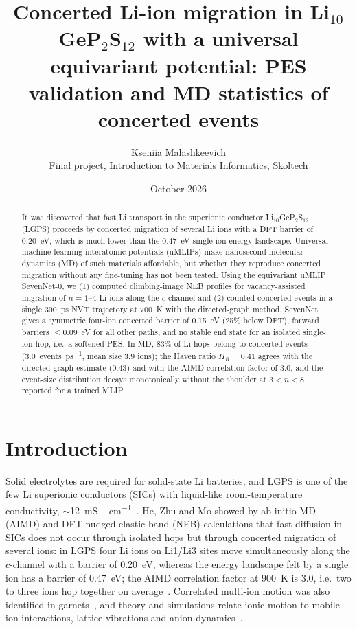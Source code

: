 \documentclass[11pt,a4paper]{article}
\title{\vspace{-1.2cm}\textbf{Concerted Li-ion migration in Li$_{10}$GeP$_2$S$_{12}$ with a universal equivariant potential: PES validation and MD statistics of concerted events}}
\author{Kseniia Malashkeevich \\ \small Final project, Introduction to Materials Informatics, Skoltech}
\date{\small October 2026}
\begin{document}
\maketitle
\vspace{-0.6cm}

\begin{abstract}
\noindent It was discovered that fast Li transport in the superionic conductor Li$_{10}$GeP$_2$S$_{12}$ (LGPS) proceeds by concerted migration of several Li ions with a DFT barrier of \SI{0.20}{eV}, which is much lower than the \SI{0.47}{eV} single-ion energy landscape. Universal machine-learning interatomic potentials (uMLIPs) make nanosecond molecular dynamics (MD) of such materials affordable, but whether they reproduce concerted migration without any fine-tuning has not been tested. Using the equivariant uMLIP SevenNet-0, we (1) computed climbing-image NEB profiles for vacancy-assisted migration of $n=1$--4 Li ions along the $c$-channel and (2) counted concerted events in a single \SI{300}{ps} NVT trajectory at \SI{700}{K} with the directed-graph method. SevenNet gives a symmetric four-ion concerted barrier of \SI{0.15}{eV} (25\% below DFT), forward barriers $\le$\SI{0.09}{eV} for all other paths, and no stable end state for an isolated single-ion hop, i.e.\ a softened PES. In MD, 83\% of Li hops belong to concerted events (\SI{3.0}{events\per ps}, mean size 3.9 ions); the Haven ratio $H_R=0.41$ agrees with the directed-graph estimate (0.43) and with the AIMD correlation factor of 3.0, and the event-size distribution decays monotonically without the shoulder at $3<n<8$ reported for a trained MLIP.
\end{abstract}

\section{Introduction}
Solid electrolytes are required for solid-state Li batteries, and LGPS is one of the few Li superionic conductors (SICs) with liquid-like room-temperature conductivity, $\sim$\SI{12}{mS\,cm^{-1}}~\cite{Kamaya2011}. He, Zhu and Mo showed by ab initio MD (AIMD) and DFT nudged elastic band (NEB) calculations that fast diffusion in SICs does not occur through isolated hops but through concerted migration of several ions: in LGPS four Li ions on Li1/Li3 sites move simultaneously along the $c$-channel with a barrier of \SI{0.20}{eV}, whereas the energy landscape felt by a single ion has a barrier of \SI{0.47}{eV}; the AIMD correlation factor at \SI{900}{K} is 3.0, i.e.\ two to three ions hop together on average~\cite{He2017}. Correlated multi-ion motion was also identified in garnets~\cite{Burbano2016,Kozinsky2016}, and theory and simulations relate ionic motion to mobile-ion interactions, lattice vibrations and anion dynamics~\cite{Rodin2022,Rodin2025,Gordiz2019,Jun2024}.
\end{document}
